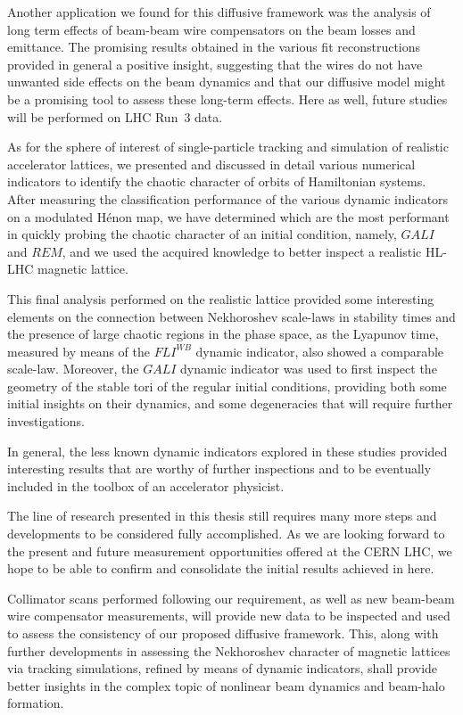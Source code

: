 Another application we found for this diffusive framework was the analysis of long term effects of beam-beam wire compensators on the beam losses and emittance. The promising results obtained in the various fit reconstructions provided in general a positive insight, suggesting that the wires do not have unwanted side effects on the beam dynamics and that our diffusive model might be a promising tool to assess these long-term effects. Here as well, future studies will be performed on LHC Run~3 data.

As for the sphere of interest of single-particle tracking and simulation of realistic accelerator lattices, we presented and discussed in detail various numerical indicators to identify the chaotic character of orbits of Hamiltonian systems. After measuring the classification performance of the various dynamic indicators on a modulated Hénon map, we have determined which are the most performant in quickly probing the chaotic character of an initial condition, namely, $GALI$ and $REM$, and we used the acquired knowledge to better inspect a realistic HL-LHC magnetic lattice.

This final analysis performed on the realistic lattice provided some interesting elements on the connection between Nekhoroshev scale-laws in stability times and the presence of large chaotic regions in the phase space, as the Lyapunov time, measured by means of the $FLI^{WB}$ dynamic indicator, also showed a comparable scale-law. Moreover, the $GALI$ dynamic indicator was used to first inspect the geometry of the stable tori of the regular initial conditions, providing both some initial insights on their dynamics, and some degeneracies that will require further investigations.

In general, the less known dynamic indicators explored in these studies provided interesting results that are worthy of further inspections and to be eventually included in the toolbox of an accelerator physicist.

The line of research presented in this thesis still requires many more steps and developments to be considered fully accomplished. As we are looking forward to the present and future measurement opportunities offered at the CERN LHC, we hope to be able to confirm and consolidate the initial results achieved in here.

Collimator scans performed following our requirement, as well as new beam-beam wire compensator measurements, will provide new data to be inspected and used to assess the consistency of our proposed diffusive framework. This, along with further developments in assessing the Nekhoroshev character of magnetic lattices via tracking simulations, refined by means of dynamic indicators, shall provide better insights in the complex topic of nonlinear beam dynamics and beam-halo formation.


